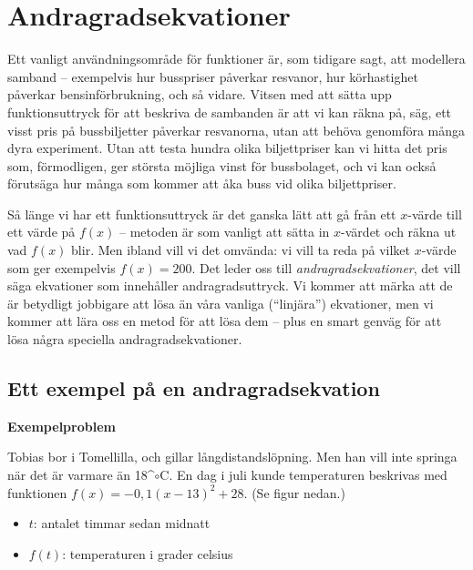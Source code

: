 \section{Andragradsekvationer}

Ett vanligt användningsområde för funktioner är, som tidigare sagt, att modellera samband -- exempelvis hur busspriser påverkar resvanor, hur körhastighet påverkar bensinförbrukning, och så vidare.
Vitsen med att sätta upp funktionsuttryck för att beskriva de sambanden är att vi kan räkna på, säg, ett visst pris på bussbiljetter påverkar resvanorna, utan att behöva genomföra många dyra experiment.
Utan att testa hundra olika biljettpriser kan vi hitta det pris som, förmodligen, ger största möjliga vinst för bussbolaget, och vi kan också förutsäga hur många som kommer att åka buss vid olika biljettpriser.

Så länge vi har ett funktionsuttryck är det ganska lätt att gå från ett $x$-värde till ett värde på $f(x)$ -- metoden är som vanligt att sätta in $x$-värdet och räkna ut vad $f(x)$ blir.
Men ibland vill vi det omvända: vi vill ta reda på vilket $x$-värde som ger exempelvis $f(x)=200$.
Det leder oss till \emph{andragradsekvationer}, det vill säga ekvationer som innehåller andragradsuttryck.
Vi kommer att märka att de är betydligt jobbigare att lösa än våra vanliga (``linjära'') ekvationer, men vi kommer att lära oss en metod för att lösa dem -- plus en smart genväg för att lösa några speciella andragradsekvationer.

\subsection{Ett exempel på en andragradsekvation}

\textbf{Exempelproblem}

Tobias bor i Tomellilla, och gillar långdistandslöpning. Men han vill inte springa när det är varmare än 18^${\circ}$C. En dag i juli kunde temperaturen beskrivas med funktionen $f(x) = -0,1(x-13)^2+28$. (Se figur nedan.)
\begin{itemize}
  \item[] $t$: antalet timmar sedan midnatt
  \item[] $f(t)$: temperaturen i grader celsius
\end{itemize}

